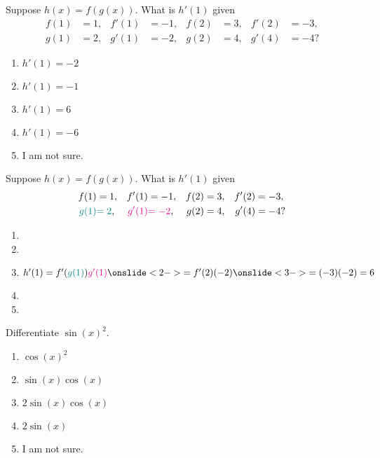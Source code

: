\documentclass[14pt]{beamer}
\begin{document}
\begin{frame}
  Suppose \(h(x) = f(g(x))\). What is \(h'(1)\) given
  \begin{align*}
    f(1) &= 1,& f'(1) &= -1, &f(2) &= 3, & f'(2) &= -3, \\
    g(1) &= 2,& g'(1) &= -2, &g(2) &= 4, & g'(4) &= -4?
  \end{align*}

  \medskip
  \begin{enumerate} 
    \item \(h'(1) = -2\)
    \item \(h'(1) = -1\)
    \item \(h'(1) = 6\)
    \item \(h'(1) = -6\)
    \item I am not sure.
  \end{enumerate} 
\end{frame}

\begin{frame}
  Suppose \(h(x) = f(g(x))\). What is \(h'(1)\) given
  \begin{align*}
    f(1) &= 1,& f'(1) &= -1, &f(2) &= 3, & f'(2) &= -3, \\
    {\color{teal}g(1)} &{\color{teal}= 2},& {\color{magenta}g'(1)} &{\color{magenta}= -2}, &g(2) &= 4, & g'(4) &= -4?
  \end{align*}

  \medskip
  \begin{enumerate} 
    \item 
    \item 
    \item \(h'(1) = f'({\color{teal}g(1)}){\color{magenta}g'(1)} \onslide<2->{= f'(2)(-2)} \onslide<3->{= (-3)(-2) = 6}\)
    \item 
    \item 
  \end{enumerate} 
\end{frame}

\begin{frame}
  Differentiate \(\sin(x)^{2}\).

  \medskip
  \begin{enumerate} 
    \item \(\cos(x)^{2}\)
    \item \(\sin(x)\cos(x)\)
    \item \(2\sin(x)\cos(x)\)
    \item \(2\sin(x)\)
    \item I am not sure.
  \end{enumerate} 
\end{frame}
\end{document}
